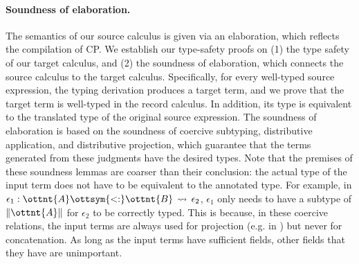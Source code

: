\paragraph{Soundness of elaboration.}
The semantics of our source calculus is given via an elaboration, which reflects
the compilation of CP. We establish our type-safety proofs on (1) the type
safety of our target calculus, and (2) the soundness of elaboration, which
connects the source calculus to the target calculus. Specifically, for every
well-typed source expression, the typing derivation produces a target term, and
we prove that the target term is well-typed in the record calculus. In addition,
its type is equivalent to the translated type of the original source expression.
The soundness of elaboration is based on the soundness of coercive subtyping,
distributive application, and distributive projection, which guarantee that the
terms generated from these judgments have the desired types. Note that the
premises of these soundness lemmas are coarser than their conclusion: the actual
type of the input term does not have to be equivalent to the annotated type. For
example, in $\epsilon_{{\mathrm{1}}}  :  \ottnt{A}  \ottsym{<:}  \ottnt{B}  \,\rightsquigarrow\,  \epsilon_{{\mathrm{2}}}$, $\epsilon_{{\mathrm{1}}}$ only needs to have a subtype of
$\|  \ottnt{A}  \|$ for $\epsilon_{{\mathrm{2}}}$ to be correctly typed. This is because, in these
coercive relations, the input terms are always used for projection (e.g. in
) but never for concatenation. As long as the input terms
have sufficient fields, other fields that they have are unimportant.

